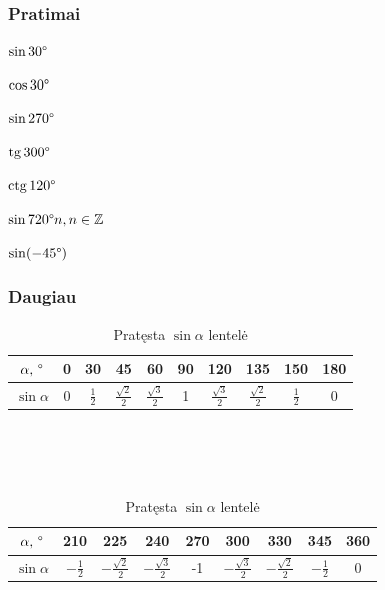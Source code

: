 \documentclass[fleqn]{article} %
\newenvironment{exercises}{\begin{enumerate*}[label=\alph*), itemjoin=\qquad]}{\end{enumerate*}}
\DeclareMathOperator{\tg}{tg}
\DeclareMathOperator{\ctg}{ctg}
\begin{document}
\subsubsection{Pratimai}

\begin{exercises}
    \item $\sin 30\degree         $
    \item $\cos 30\degree         $
    \item $\sin 270\degree        $
    \item $\tg  300\degree        $ 
    \item $\ctg 120\degree        $
    \item $\sin 720\degree n, n \in \mathbb{Z} $
    \item $\sin(-45\degree) $
\end{exercises} 


\subsubsection{Daugiau}

\begin{table}[h]
    \begin{tabular}{|c|ccccccccc|} 
        \hline
        $\alpha,\,\degree$ & 0 & 30 & 45 & 60 & 90 & 120 & 135 & 150 & 180 \\ 
        \hline
        $\sin \alpha$ & 0 & $\frac{1}{2}$ & $\frac{\sqrt{2}}{2}$ & $\frac{\sqrt{3}}{2}$ & 1 
                      & $\frac{\sqrt{3}}{2}$ & $\frac{\sqrt{2}}{2}$ & $\frac{1}{2}$ & 0 \\
        \hline
    \end{tabular}
    \\ \\ \\
    \begin{tabular}{|c|cccccccc|}
        \hline
        $\alpha,\,\degree$ & 210 & 225 & 240 & 270 & 300 & 330 & 345 & 360 \\ 
        \hline
        $\sin \alpha$ & $-\frac{1}{2}$ & $-\frac{\sqrt{2}}{2}$ & $-\frac{\sqrt{3}}{2}$ & -1
                      & $-\frac{\sqrt{3}}{2}$ & $-\frac{\sqrt{2}}{2}$ & $-\frac{1}{2}$ & 0 \\
        \hline
    \end{tabular}
    \caption{Pratęsta $\sin \alpha$ lentelė}
\end{table}
\end{document}
